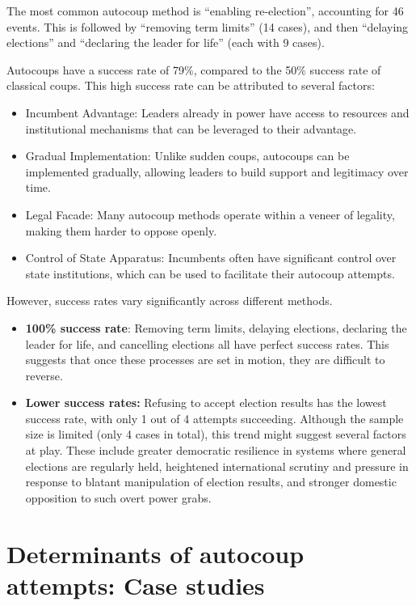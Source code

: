 \documentclass[
  12pt,
]{report}
\begin{document}
The most common autocoup method is ``enabling re-election'', accounting
for 46 events. This is followed by ``removing term limits'' (14 cases),
and then ``delaying elections'' and ``declaring the leader for life''
(each with 9 cases).

Autocoups have a success rate of 79\%, compared to the 50\% success rate
of classical coups. This high success rate can be attributed to several
factors:

\begin{itemize}
\item
  Incumbent Advantage: Leaders already in power have access to resources
  and institutional mechanisms that can be leveraged to their advantage.
\item
  Gradual Implementation: Unlike sudden coups, autocoups can be
  implemented gradually, allowing leaders to build support and
  legitimacy over time.
\item
  Legal Facade: Many autocoup methods operate within a veneer of
  legality, making them harder to oppose openly.
\item
  Control of State Apparatus: Incumbents often have significant control
  over state institutions, which can be used to facilitate their
  autocoup attempts.
\end{itemize}

However, success rates vary significantly across different methods.

\begin{itemize}
\item
  \textbf{100\% success rate}: Removing term limits, delaying elections,
  declaring the leader for life, and cancelling elections all have
  perfect success rates. This suggests that once these processes are set
  in motion, they are difficult to reverse.
\item
  \textbf{Lower success rates:} Refusing to accept election results has
  the lowest success rate, with only 1 out of 4 attempts succeeding.
  Although the sample size is limited (only 4 cases in total), this
  trend might suggest several factors at play. These include greater
  democratic resilience in systems where general elections are regularly
  held, heightened international scrutiny and pressure in response to
  blatant manipulation of election results, and stronger domestic
  opposition to such overt power grabs.
\end{itemize}

\section{Determinants of autocoup attempts: Case
studies}\label{determinants-of-autocoup-attempts-case-studies}
\end{document}
